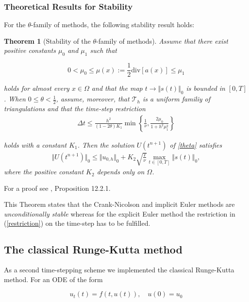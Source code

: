 \documentclass[a4paper, 11pt, twoside]{article}
\newtheorem{theorem}{Theorem}[section]
\begin{document}
\subsubsection{Theoretical Results for Stability}

For the $\theta$-family of methods, the following stability result holds:

\begin{theorem}[Stability of the $\theta$-family of methods]
Assume that there exist positive constants $\mu_{0}$ and $\mu_{1}$ such that

	\[0 < \mu_{0} \leq \mu(x) := \frac{1}{2}\mathrm{div }[a(x)] \leq \mu_{1}\]
	
holds for almost every $x \in \Omega$ and that the map $t \to \Vert s(t) \Vert _0$ is bounded in $[0, T]$. When $0 \leq \theta < \frac{1}{2}$, assume, moreover, that $\mathcal{T}_{h}$ is a uniform familiy of triangulations and that the time-step restriction
\begin{align}
\Delta t \leq \frac{h^{2}}{(1 - 2\theta)K_{1}} \min\left\{\frac{1}{\nu}, \frac{2\mu_{0}}{1 + h^{2}\mu_{1}^{2}}\right\}\label{restriction}
\end{align}
	
holds with a constant $K_{1}$. Then the solution $U(t^{n+1})$ of \eqref{theta} satisfies
\begin{align*}
	\Vert U(t^{n+1}) \Vert_0 \leq \Vert u_{0, h} \Vert_0 + K_{2}\sqrt{\frac{T}{\nu}} \max_{t \in [0, T]} \Vert s(t) \Vert_0, 
\end{align*}
where the positive constant $K_{2}$ depends only on $\Omega$.
\end{theorem}

For a proof see \cite{Quarteroni}, Proposition 12.2.1.
 
This Theorem states that the Crank-Nicolson and implicit Euler methods are \emph{unconditionally stable} whereas for the explicit Euler method the restriction in (\ref{restriction}) on the time-step has to be fulfilled.

\subsection{The classical Runge-Kutta method}

As a second time-stepping scheme we implemented the classical Runge-Kutta method. For an ODE of the form
	
	\begin{equation}\label{ODE_class}
		u_{t}(t) = f(t, u(t)), \quad u(0) = u_{0}
	\end{equation}
	
\end{document}
